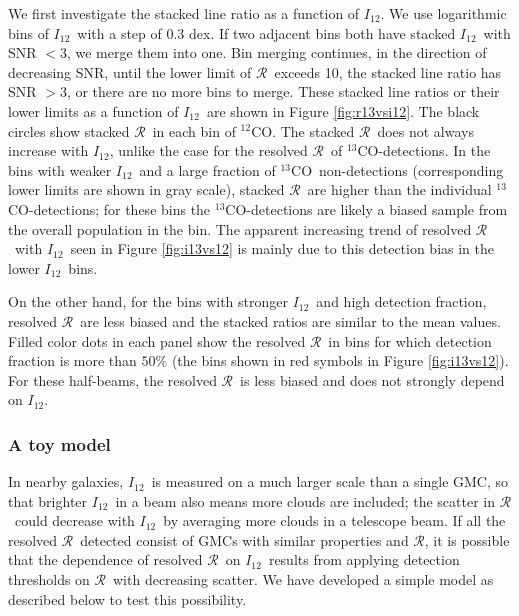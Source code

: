 \documentclass{emulateapj}
\def\ttco{\mbox{$^{13}$CO}}
\def\twco{\mbox{$^{12}$CO}}
\def\rtt{$\mathcal{R}$}
\def\itw{$I_{12}$}
\begin{document}
We first investigate the stacked line ratio as a function of \itw. 
We use logarithmic bins of \itw \ with a step of 0.3 dex. 
If two adjacent bins both have stacked \itw \ with SNR $< 3$, we merge them into one. Bin merging continues,  in the direction of decreasing SNR, until the lower limit of \rtt \ exceeds 10, the stacked line ratio has SNR $>3$, or there are no more bins to merge. 
These stacked line ratios or their lower limits as a function of \itw \ are shown 
in Figure \ref{fig:r13vsi12}.
The black circles show stacked \rtt \ in each bin of \twco. 
The stacked \rtt \  does not always increase with \itw, unlike the case for the resolved \rtt  \ of \ttco-detections.
In the bins with weaker \itw \ and a large fraction of \ttco \ non-detections 
(corresponding lower limits are shown in gray scale),      
stacked \rtt \ are higher than the individual  \ttco-detections; 
for these bins the \ttco-detections are likely a biased sample from  the overall population 
in the bin. 
The apparent increasing trend of resolved \rtt \ with \itw \ 
seen in Figure \ref{fig:i13vs12} is 
mainly due to this detection bias in the lower \itw \ bins.

On the other hand, for the bins with stronger \itw \ and high detection fraction,  resolved \rtt \ are less biased and the stacked ratios are similar to the mean values. 
Filled color dots in each panel show the resolved \rtt \ in bins for which detection fraction is more than $50\%$ (the bins shown in red symbols in Figure \ref{fig:i13vs12}).    
For these half-beams, the resolved \rtt \ is less biased and does not strongly depend on \itw. 

\subsubsection{A toy model} \label{sec:biasmd}

In nearby galaxies, \itw \ is measured on a much larger scale than a 
single GMC, so that brighter \itw \ in a beam also means more clouds are
included; the scatter in \rtt \ could decrease with \itw \ by averaging more clouds in a telescope beam. If all the resolved \rtt \ detected consist of GMCs with similar properties and \rtt, it is possible that the dependence of resolved \rtt \ on \itw \ results from applying detection thresholds on \rtt \ with decreasing scatter.  We have developed a simple model as described below to test this possibility. 
\end{document}
